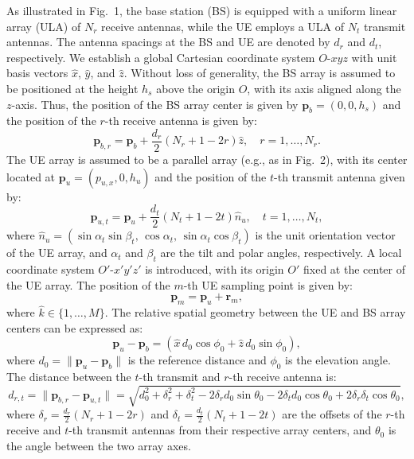 \documentclass[journal]{IEEEtran}
\begin{document}
As illustrated in Fig.~1, the base station (BS) is equipped with a uniform linear array (ULA) of $N_r$ receive antennas, while the UE employs a ULA of $N_t$ transmit antennas. The antenna spacings at the BS and UE are denoted by $d_r$ and $d_t$, respectively. We establish a global Cartesian coordinate system $O$-$xyz$ with unit basis vectors $\hat{x}$, $\hat{y}$, and $\hat{z}$. Without loss of generality, the BS array is assumed to be positioned at the height $h_s$ above the origin $O$, with its axis aligned along the $z$-axis. Thus, the position of the BS array center is given by $\mathbf{p}_b = (0, 0, h_s)$ and the position of the $r$-th receive antenna is given by:
\begin{equation}
    \mathbf{p}_{b,r} = \mathbf{p}_b + \frac{d_r}{2}(N_r + 1 - 2r)\hat{z}, \quad r = 1, \ldots, N_r.
\end{equation}
The UE array is assumed to be a parallel array (e.g., as in Fig.~2), with its center located at $\mathbf{p}_u = (p_{u,x}, 0, h_u)$ and the position of the $t$-th transmit antenna given by:
\begin{equation}
    \mathbf{p}_{u,t} = \mathbf{p}_u + \frac{d_t}{2}(N_t + 1 - 2t)\hat{n}_u, \quad t = 1, \ldots, N_t,
\end{equation}
where $\hat{n}_u = (\sin\alpha_t\sin\beta_t,\, \cos\alpha_t,\, \sin\alpha_t\cos\beta_t)$ is the unit orientation vector of the UE array, and $\alpha_t$ and $\beta_t$ are the tilt and polar angles, respectively. A local coordinate system $O'$-$x'y'z'$ is introduced, with its origin $O'$ fixed at the center of the UE array. The position of the $m$-th UE sampling point is given by:
\begin{equation}
    \mathbf{p}_m = \mathbf{p}_u + \mathbf{r}_m,
\end{equation}
where $\hat{k} \in \{1, \ldots, M\}$. The relative spatial geometry between the UE and BS array centers can be expressed as:
\begin{equation}
    \mathbf{p}_u - \mathbf{p}_b = (\hat{x}\, d_0 \cos\phi_0 + \hat{z}\, d_0 \sin\phi_0),
\end{equation}
where $d_0 = \|\mathbf{p}_u - \mathbf{p}_b\|$ is the reference distance and $\phi_0$ is the elevation angle. The distance between the $t$-th transmit and $r$-th receive antenna is:
\begin{equation}
    d_{r,t} = \|\mathbf{p}_{b,r} - \mathbf{p}_{u,t}\|
    = \sqrt{d_0^2 + \delta_r^2 + \delta_t^2 - 2\delta_r d_0 \sin\theta_0 - 2\delta_t d_0 \cos\theta_0 + 2\delta_r\delta_t \cos\theta_0},
\end{equation}
where $\delta_r = \frac{d_r}{2}(N_r + 1 - 2r)$ and $\delta_t = \frac{d_t}{2}(N_t + 1 - 2t)$ are the offsets of the $r$-th receive and $t$-th transmit antennas from their respective array centers, and $\theta_0$ is the angle between the two array axes.
\end{document}

